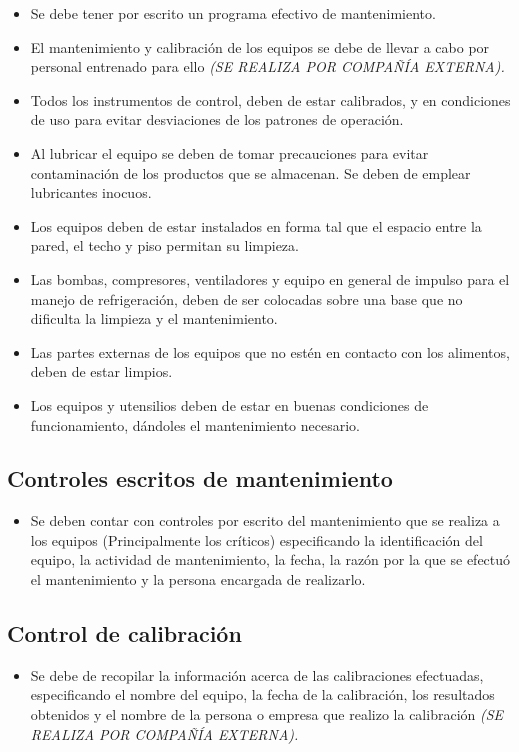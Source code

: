 \begin{itemize}
	\item Se debe tener por escrito un programa efectivo de mantenimiento.
	\item El mantenimiento y calibración de los equipos se debe de llevar a cabo por personal entrenado para ello \emph{(SE REALIZA POR COMPAÑÍA EXTERNA).}
	\item Todos los instrumentos de control, deben de estar calibrados, y en condiciones de uso para evitar desviaciones de los patrones de operación.
	\item Al lubricar el equipo se deben de tomar precauciones para evitar contaminación de los productos que se almacenan. Se deben de emplear lubricantes inocuos.
	\item Los equipos deben de estar instalados en forma tal que el espacio entre la pared, el techo y piso permitan su limpieza.
	\item Las bombas, compresores, ventiladores y equipo en general de impulso para el manejo de refrigeración, deben de ser colocadas sobre una base que no dificulta la limpieza y el mantenimiento.
	\item Las partes externas de los equipos que no estén en contacto con los alimentos, deben de estar limpios.
	\item Los equipos y utensilios deben de estar en buenas condiciones de funcionamiento, dándoles el mantenimiento necesario.
\end{itemize}

\subsection{Controles escritos de mantenimiento}

\begin{itemize}
	\item Se deben contar con controles por escrito del mantenimiento que se realiza a los equipos (Principalmente los críticos) especificando la identificación del equipo, la actividad de mantenimiento, la fecha, la razón por la que se efectuó el mantenimiento y la persona encargada de realizarlo.
\end{itemize}

\subsection{Control de calibración}

\begin{itemize}
	\item Se debe de recopilar la información acerca de las calibraciones efectuadas, especificando el nombre del equipo, la fecha de la calibración, los resultados obtenidos y el nombre de la persona o empresa que realizo la calibración \emph{(SE REALIZA POR COMPAÑÍA EXTERNA).}
\end{itemize}


